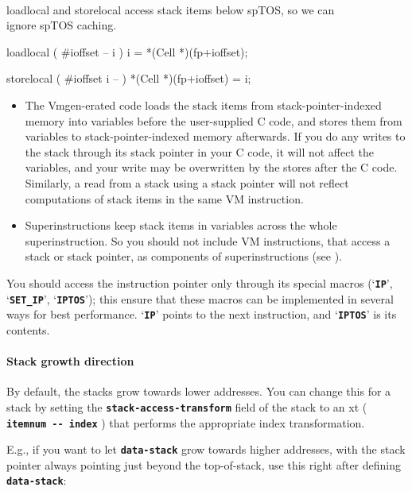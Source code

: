 \documentclass[10pt,english]{article}
\begin{document}
\\ loadlocal and storelocal access stack items below spTOS, so we can
\\ ignore spTOS caching.

loadlocal ( #ioffset -- i )
i = *(Cell *)(fp+ioffset);

storelocal ( #ioffset i -- )
*(Cell *)(fp+ioffset) = i;
\nwendcode{}\nwdocspar

\begin{itemize}
\item The Vmgen-erated code loads the stack items from stack-pointer-indexed
memory into variables before the user-supplied C code, and stores
them from variables to stack-pointer-indexed memory afterwards. If
you do any writes to the stack through its stack pointer in your C
code, it will not affect the variables, and your write may be overwritten
by the stores after the C code. Similarly, a read from a stack using
a stack pointer will not reflect computations of stack items in the
same VM instruction.
\item Superinstructions keep stack items in variables across the whole superinstruction.
So you should not include VM instructions, that access a stack or
stack pointer, as components of superinstructions (see ).
\end{itemize}
You should access the instruction pointer only through its special
macros (\textquoteleft{}\texttt{\textbf{IP}}\textquoteright{}, \textquoteleft{}\texttt{\textbf{SET\_IP}}\textquoteright{},
\textquoteleft{}\texttt{\textbf{IPTOS}}\textquoteright{}); this ensure
that these macros can be implemented in several ways for best performance.
\textquoteleft{}\texttt{\textbf{IP}}\textquoteright{} points to the
next instruction, and \textquoteleft{}\texttt{\textbf{IPTOS}}\textquoteright{}
is its contents.


\paragraph{Stack growth direction\label{par:Stack-growth-direction}}

By default, the stacks grow towards lower addresses. You can change
this for a stack by setting the \texttt{\textbf{stack-access-transform}}
field of the stack to an xt ( \texttt{\textbf{itemnum -{}- index}}
) that performs the appropriate index transformation.

E.g., if you want to let \texttt{\textbf{data-stack}} grow towards
higher addresses, with the stack pointer always pointing just beyond
the top-of-stack, use this right after defining \texttt{\textbf{data-stack}}:
\end{document}
